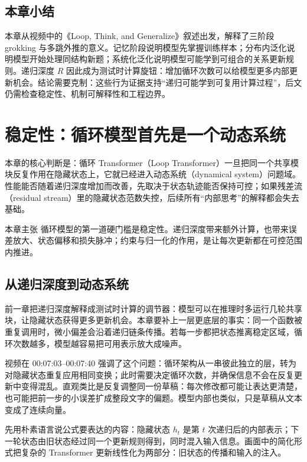 ﻿\documentclass[a4paper]{article}
\begin{document}
\subsection{本章小结}

本章从视频中的《Loop, Think, and Generalize》叙述出发，解释了三阶段 grokking 与多跳外推的意义。记忆阶段说明模型先掌握训练样本；分布内泛化说明模型开始处理同结构新题；系统化泛化说明模型可能学到可组合的关系更新规则。递归深度 \(R\) 因此成为测试时计算旋钮：增加循环次数可以给模型更多内部更新机会。结论需要克制：这些行为证据支持“递归可能学到可复用计算过程”，后文仍需检查稳定性、机制可解释性和工程边界。


\section{稳定性：循环模型首先是一个动态系统}
\label{sec:stability-dynamical-system}

本章的核心判断是：循环 Transformer（Loop Transformer）一旦把同一个共享模块反复作用在隐藏状态上，它就已经进入动态系统（dynamical system）问题域。性能能否随着递归深度增加而改善，先取决于状态轨迹能否保持可控；如果残差流（residual stream）里的隐藏状态范数失控，后续所有“内部思考”的解释都会失去基础。

\begin{importantbox}{本章主张}
循环模型的第一道硬门槛是稳定性。递归深度带来额外计算，也带来误差放大、状态偏移和损失脉冲；约束与归一化的作用，是让每次更新都在可控范围内推进。
\end{importantbox}

\subsection{从递归深度到动态系统}

前一章把递归深度解释成测试时计算的调节器：模型可以在推理时多运行几轮共享块，让隐藏状态获得更多更新机会。本章要补上一层更底层的事实：同一个函数被重复调用时，微小偏差会沿着递归链条传播。若每一步都把状态推离稳定区域，循环次数越多，模型越容易把可用表示放大成噪声。

视频在 00:07:03--00:07:40 强调了这个问题：循环架构从一串彼此独立的层，转为对隐藏状态重复应用相同变换；此时需要决定循环次数，并确保信息不会在反复更新中变得混乱。直观类比是反复调整同一份草稿：每次修改都可能让表达更清楚，也可能把前一步的小误差扩成整段文字的偏题。模型内部也类似，只是草稿从文本变成了连续向量。

先用朴素语言说公式要表达的内容：隐藏状态 \(h_t\) 是第 \(t\) 次递归后的内部表示；下一轮状态由旧状态经过同一个更新规则得到，同时混入输入信息。画面中的简化形式把复杂的 Transformer 更新线性化为两部分：旧状态的传播和输入的注入。
\end{document}
